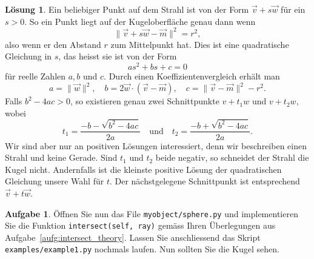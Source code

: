 \documentclass[12pt,a4paper]{article}
\theoremstyle{definition}
\newtheorem{aufgabe}{Aufgabe}
\theoremstyle{definition}
\newtheorem*{losung*}{Lösung}
\begin{document}
\begin{losung*}
	Ein beliebiger Punkt auf dem Strahl ist von der Form $\vec{v}+s\vec{w}$ für ein $s>0$.
	So ein Punkt liegt auf der Kugeloberfläche genau dann wenn
	\begin{equation*}
		\lVert\vec{v}+s\vec{w}-\vec{m}\rVert^2=r^2,
	\end{equation*}
	also wenn er den Abstand $r$ zum Mittelpunkt hat.
	Dies ist eine quadratische Gleichung in $s$, das heisst sie ist von der Form
	\begin{equation*}
		as^2+bs+c=0
	\end{equation*}
	für reelle Zahlen $a,b$ und $c$.
	Durch einen Koeffizientenvergleich erhält man
	\begin{equation*}
		a=\rVert\vec{w}\rVert^2,\quad
		b=2\vec{w}\cdot(\vec{v}-\vec{m}),\quad
		c=\lVert\vec{v}-\vec{m}\rVert^2-r^2.
	\end{equation*}
	Falls $b^2-4ac>0$, so existieren genau zwei Schnittpunkte $v+t_1w$ und $v+t_2w$, wobei
	\begin{equation*}
		t_1=\frac{-b-\sqrt{b^2-4ac}}{2a}
		\quad\text{und}\quad
		t_2=\frac{-b+\sqrt{b^2-4ac}}{2a}.
	\end{equation*}
	Wir sind aber nur an positiven Lösungen interessiert, denn wir beschreiben einen Strahl und keine Gerade.
	Sind $t_1$ und $t_2$ beide negativ, so schneidet der Strahl die Kugel nicht.
	Andernfalls ist die kleinste positive Lösung der quadratischen Gleichung unsere Wahl für $t$.
	Der nächstgelegene Schnittpunkt ist entsprechend $\vec{v}+t\vec{w}$.
\end{losung*}
\begin{aufgabe}\label{aufg:intersect_implementation}
	Öffnen Sie nun das File \texttt{myobject/sphere.py} und implementieren Sie die Funktion \texttt{intersect(self, ray)} gemäss Ihren Überlegungen aus Aufgabe~\ref{aufg:intersect_theory}.
	Lassen Sie anschliessend das Skript \texttt{examples/example1.py} nochmals laufen.
	Nun sollten Sie die Kugel sehen.
\end{aufgabe}
\end{document}
